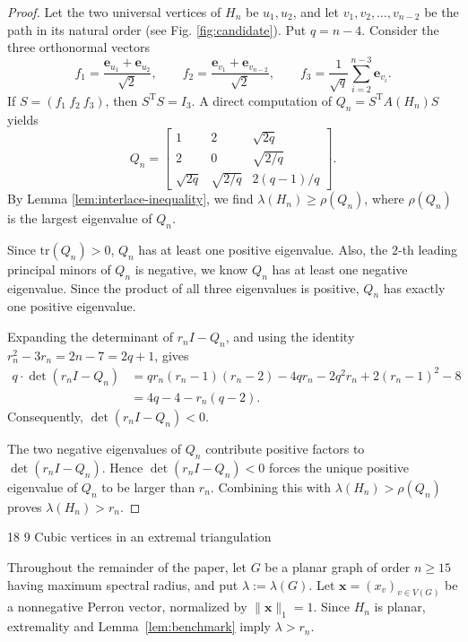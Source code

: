 \documentclass[11pt]{article}
\makeatletter
\renewcommand\section{\@startsection{section}{1}{\z@}%
{18\p@ \@plus 6\p@ \@minus 3\p@}%
{9\p@ \@plus 6\p@ \@minus 3\p@}%
{\large\bfseries\boldmath}}
\theoremstyle{plain}
\theoremstyle{definition}
\numberwithin{equation}{section}
\makeatother
\begin{document}
\begin{proof}
Let the two universal vertices of $H_n$ be $u_1,u_2$, and let $v_1,v_2,\ldots,v_{n-2}$ 
be the path in its natural order (see Fig. \ref{fig:candidate}).  
Put $q=n-4$. Consider the three orthonormal vectors
\[
 f_1 = \frac{\bm{e}_{u_1} + \bm{e}_{u_2}}{\sqrt{2}}, \qquad
 f_2 = \frac{\bm{e}_{v_1} + \bm{e}_{v_{n-2}}}{\sqrt{2}}, \qquad
 f_3 = \frac{1}{\sqrt{q}} \sum_{i=2}^{n-3} \bm{e}_{v_i}.
\]
If $S=(f_1\ f_2\ f_3)$, then $S^{\mathrm{T}} S = I_3$. A direct computation of $Q_n = S^{\mathrm{T}} A(H_n) S$ yields
\[
Q_n =
\begin{bmatrix}
 1 & 2 & \sqrt{2q} \\
 2 & 0 & \sqrt{2/q} \\
 \sqrt{2q} & \sqrt{2/q} & 2(q-1)/q
\end{bmatrix}.
\]
By Lemma \ref{lem:interlace-inequality}, we find
$\lambda(H_n)\geq\rho(Q_n)$, where $\rho(Q_n)$ is the largest eigenvalue of $Q_n$.

Since $\mathrm{tr} (Q_n) > 0$, $Q_n$ has at least one positive eigenvalue. 
Also, the $2$-th leading principal minors of $Q_n$ is negative, we know $Q_n$
has at least one negative eigenvalue. Since the product of all three eigenvalues is positive, 
$Q_n$ has exactly one positive eigenvalue.

Expanding the determinant of $r_n I - Q_n$, and using the identity $r_n^2 - 3r_n = 2n-7=2q+1$, gives
\begin{align*}
q\cdot\det(r_nI - Q_n)
& = qr_n(r_n - 1)(r_n - 2) - 4qr_n - 2q^2 r_n + 2(r_n - 1)^2 - 8 \\
& = 4q - 4 - r_n(q - 2).
\end{align*}
Consequently, $\det (r_nI - Q_n) < 0$. 

The two negative eigenvalues of $Q_n$ contribute positive factors to
$\det(r_nI - Q_n)$. Hence $\det (r_nI - Q_n) < 0$ forces the unique positive eigenvalue of $Q_n$ to be
larger than $r_n$. Combining this with $\lambda(H_n) > \rho(Q_n)$ proves $\lambda(H_n) > r_n$.
\end{proof}

\section{Cubic vertices in an extremal triangulation}
\label{sec:series-lemmas}

Throughout the remainder of the paper, let $G$ be a planar graph of order $n\geq 15$ having 
maximum spectral radius, and put $\lambda := \lambda(G)$. Let $\bm{x} = (x_v)_{v\in V(G)}$ 
be a nonnegative Perron vector, normalized by $\|\bm{x}\|_1 = 1$. Since $H_n$ is planar, extremality and Lemma~\ref{lem:benchmark} imply $\lambda > r_n$.
\end{document}
